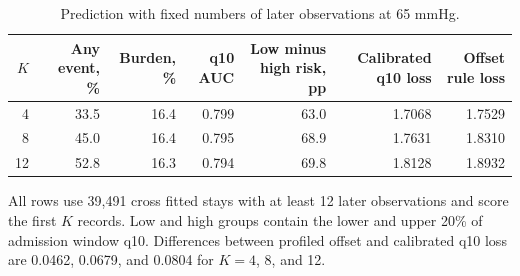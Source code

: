 \begin{table}[!htbp]
\caption{Prediction with fixed numbers of later observations at 65 mmHg.}
\label{tab:fixed_opportunity_main}
\centering
\small
\setlength{\tabcolsep}{4pt}
\begin{tabular}{rrrrrrr}
\toprule
$K$ & Any event, \% & Burden, \% & q10 AUC & Low minus high risk, pp & Calibrated q10 loss & Offset rule loss\\
\midrule
4 & 33.5 & 16.4 & 0.799 & 63.0 & 1.7068 & 1.7529\\
8 & 45.0 & 16.4 & 0.795 & 68.9 & 1.7631 & 1.8310\\
12 & 52.8 & 16.3 & 0.794 & 69.8 & 1.8128 & 1.8932\\
\bottomrule
\end{tabular}
\par\smallskip
\footnotesize{All rows use 39,491 cross fitted stays with at least 12 later observations and score the first $K$ records. Low and high groups contain the lower and upper 20\% of admission window q10. Differences between profiled offset and calibrated q10 loss are 0.0462, 0.0679, and 0.0804 for $K=4$, 8, and 12.}
\end{table}
